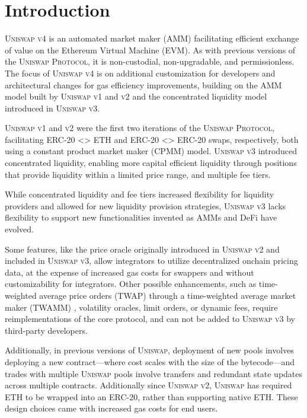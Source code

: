 \documentclass[sigconf,nonacm,prologue,table]{acmart}
\numberwithin{equation}{section}
\theoremstyle{definition}
\theoremstyle{remark}
\begin{document}
\section{Introduction} \label{sec:introduction}
\textsc{Uniswap v4} is an automated market maker (AMM) facilitating efficient exchange of value on the Ethereum Virtual Machine (EVM). As with previous versions of the \textsc{Uniswap Protocol}, it is non-custodial, non-upgradable, and permissionless. The focus of \textsc{Uniswap v4} is on additional customization for developers and architectural changes for gas efficiency improvements, building on the AMM model built by \textsc{Uniswap v1} and \textsc{v2} and the concentrated liquidity model introduced in \textsc{Uniswap v3}.

\textsc{Uniswap v1} \cite{Adams18} and \textsc{v2} \cite{Adams20} were the first two iterations of the \textsc{Uniswap Protocol}, facilitating ERC-20 <> ETH and ERC-20 <> ERC-20 swaps, respectively, both using a constant product market maker (CPMM) model. \textsc{Uniswap v3} \cite{Adams21} introduced concentrated liquidity, enabling more capital efficient liquidity through positions that provide liquidity within a limited price range, and multiple fee tiers.

While concentrated liquidity and fee tiers increased flexibility for liquidity providers and allowed for new liquidity provision strategies, \textsc{Uniswap v3} lacks flexibility to support new functionalities invented as AMMs and DeFi have evolved.

Some features, like the price oracle originally introduced in \textsc{Uniswap v2} and included in \textsc{Uniswap v3}, allow integrators to utilize decentralized onchain pricing data, at the expense of increased gas costs for swappers and without customizability for integrators. Other possible enhancements, such as time-weighted average price orders (TWAP) through a time-weighted average market maker (TWAMM) \cite{White2021}, volatility oracles, limit orders, or dynamic fees, require reimplementations of the core protocol, and can not be added to \textsc{Uniswap v3} by third-party developers.

Additionally, in previous versions of \textsc{Uniswap}, deployment of new pools involves deploying a new contract—where cost scales with the size of the bytecode—and trades with multiple \textsc{Uniswap} pools involve transfers and redundant state updates across multiple contracts. Additionally since \textsc{Uniswap v2}, \textsc{Uniswap} has required ETH to be wrapped into an ERC-20, rather than supporting native ETH. These design choices came with increased gas costs for end users.
\end{document}
